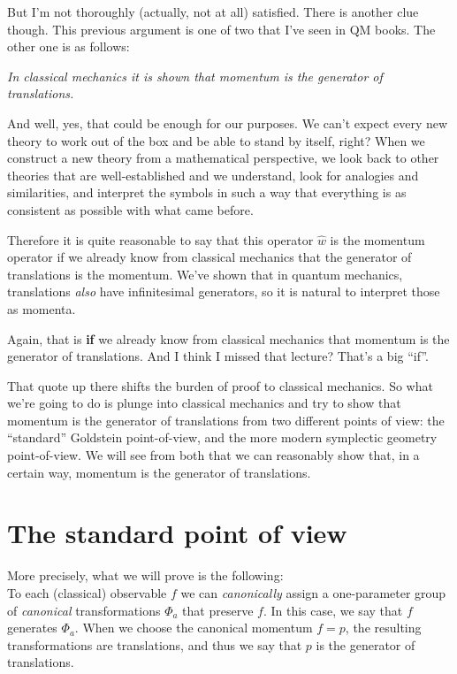 \documentclass[11pt,a4]{article}
\begin{document}
But I'm not thoroughly (actually, not at all) satisfied. There is another clue though. This previous
argument is one of two that I've seen in QM books. The other one is as follows:
\begin{center}
  \textit{In classical mechanics it is shown that momentum is the generator of
    translations.}
\end{center}
And well, yes, that could be enough for our purposes. We can't expect
every new theory to work out of the box and be able to stand by itself, right? When
we construct a new theory from a mathematical perspective, we look back to
other theories that are well-established and we understand, look for analogies and
similarities, and interpret the symbols in such a way that everything is as consistent
as possible with what came before.

Therefore it is quite reasonable to say that this operator $\hat{w}$ is the momentum operator if
we already know from classical mechanics that the generator of translations is the momentum. We've shown that
in quantum mechanics, translations \emph{also} have infinitesimal generators, so it is natural
to interpret those as momenta.

Again, that is \textbf{if} we already know from classical mechanics that momentum is the generator of translations.
And I think I missed that lecture? That's a big ``if''.

That quote up there shifts the burden of proof to classical mechanics. So what we're going to do is plunge into classical mechanics
and try to show that momentum is the generator of translations from two different points of view: the ``standard'' Goldstein point-of-view, and the
more modern symplectic geometry point-of-view. We will see from both that we can reasonably show that, in a certain way, momentum
is the generator of translations.

\section*{The standard point of view}
\label{sec:standard-pov}

More precisely, what we will prove is the following:\\
To each (classical) observable $f$ we can \emph{canonically} assign a one-parameter group
of \emph{canonical} transformations $\Phi_a$ that preserve $f$. In this case, we say that $f$ generates $\Phi_a$. When we choose the canonical momentum $f=p$, the
resulting transformations are translations, and thus we say that $p$ is the generator of translations.
\end{document}
